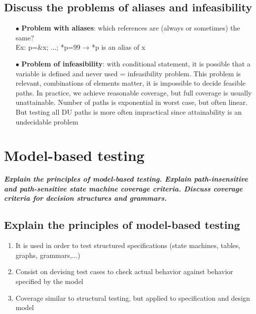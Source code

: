 \documentclass{article}
\begin{document}
\newpage
\subsection{Discuss the problems of aliases and infeasibility}
\begin{itemize}
    \item [$\bullet$]\textbf{Problem with aliases}: which references are (always or sometimes) the same?\\
Ex: p=\&x; ...; *p=99 → *p is an alias of x\\
    \item [$\bullet$]\textbf{Problem of infeasibility}: with conditional statement, it is possible that a variable is defined and
never used = infeasibility problem. This problem is relevant, combinations of elements matter, it is
impossible to decide feasible paths. In practice, we achieve reasonable coverage, but full
coverage is usually unattainable. Number of paths is exponential in worst case, but often linear.
But testing all DU paths is more often impractical since attainability is an undecidable problem
\end{itemize}


\newpage
\section{Model-based testing}
\textbf{\textit{Explain the principles of model-based testing. Explain path-insensitive and path-sensitive state machine coverage criteria. Discuss coverage criteria for decision structures and grammars.}}

\subsection{Explain the principles of model-based testing}
\begin{enumerate}
    \item It is used in order to test structured specifications (state machines, tables, graphs, grammars,...)
    \item Consist on devising test cases to check actual behavior against behavior specified by the model
    \item Coverage similar to structural testing, but applied to specification and design model
\end{enumerate}
\end{document}
